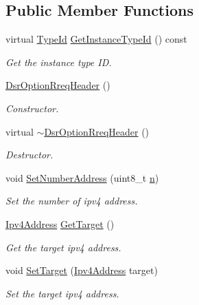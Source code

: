 \subsection*{Public Member Functions}
\begin{DoxyCompactItemize}
\item 
virtual \hyperlink{classns3_1_1TypeId}{Type\+Id} \hyperlink{classns3_1_1dsr_1_1DsrOptionRreqHeader_af739d47393386c4e4fa8871ab2a8fec7}{Get\+Instance\+Type\+Id} () const 
\begin{DoxyCompactList}\small\item\em Get the instance type ID. \end{DoxyCompactList}\item 
\hyperlink{classns3_1_1dsr_1_1DsrOptionRreqHeader_ab225ae4049ce6c45fcf0dc1cdcc4f0fd}{Dsr\+Option\+Rreq\+Header} ()
\begin{DoxyCompactList}\small\item\em Constructor. \end{DoxyCompactList}\item 
virtual \hyperlink{classns3_1_1dsr_1_1DsrOptionRreqHeader_a37b79b71589bca2ceb797d0c625407d9}{$\sim$\+Dsr\+Option\+Rreq\+Header} ()
\begin{DoxyCompactList}\small\item\em Destructor. \end{DoxyCompactList}\item 
void \hyperlink{classns3_1_1dsr_1_1DsrOptionRreqHeader_a1d42a53f53dc4e83173e1ced8b1520c0}{Set\+Number\+Address} (uint8\+\_\+t \hyperlink{lte__link__budget__x2__handover__measures_8m_abdb05bc5a064cf642a06c83b3392f148}{n})
\begin{DoxyCompactList}\small\item\em Set the number of ipv4 address. \end{DoxyCompactList}\item 
\hyperlink{classns3_1_1Ipv4Address}{Ipv4\+Address} \hyperlink{classns3_1_1dsr_1_1DsrOptionRreqHeader_a9f2b4c75e3e32afe948919da6a6d3a09}{Get\+Target} ()
\begin{DoxyCompactList}\small\item\em Get the target ipv4 address. \end{DoxyCompactList}\item 
void \hyperlink{classns3_1_1dsr_1_1DsrOptionRreqHeader_a81453bfd9f4f4df6cb61ecd1eefe11ab}{Set\+Target} (\hyperlink{classns3_1_1Ipv4Address}{Ipv4\+Address} target)
\begin{DoxyCompactList}\small\item\em Set the target ipv4 address. \end{DoxyCompactList}\item 

\end{DoxyCompactItemize}
